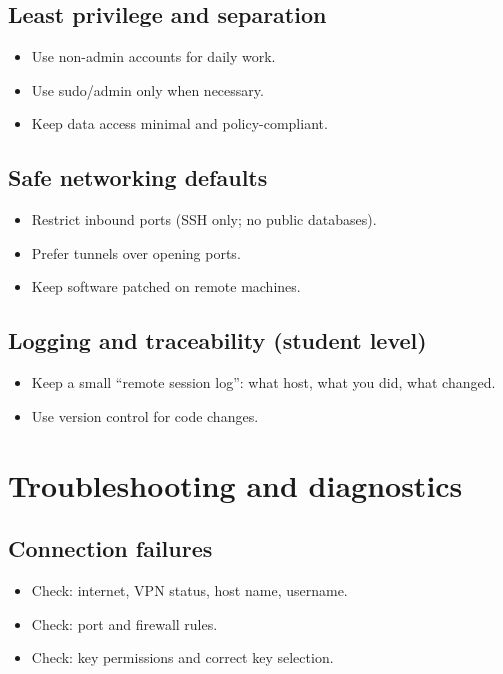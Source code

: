 \subsection{Least privilege and separation}
\begin{itemize}
\item Use non-admin accounts for daily work.
\item Use sudo/admin only when necessary.
\item Keep data access minimal and policy-compliant.
\end{itemize}

\subsection{Safe networking defaults}
\begin{itemize}
\item Restrict inbound ports (SSH only; no public databases).
\item Prefer tunnels over opening ports.
\item Keep software patched on remote machines.
\end{itemize}

\subsection{Logging and traceability (student level)}
\begin{itemize}
\item Keep a small ``remote session log'': what host, what you did, what changed.
\item Use version control for code changes.
\end{itemize}

\section{Troubleshooting and diagnostics}
\subsection{Connection failures}
\begin{itemize}
\item Check: internet, VPN status, host name, username.
\item Check: port and firewall rules.
\item Check: key permissions and correct key selection.
\end{itemize}

